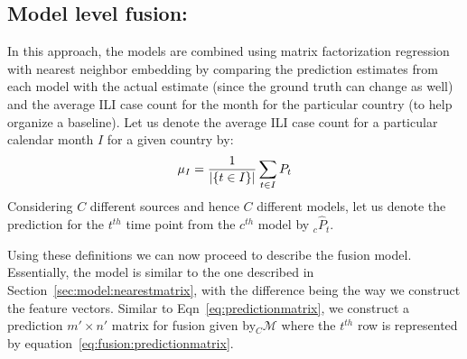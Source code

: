 \subsection{\label{sec:fusion:model} Model level fusion:}
In this approach, the models are combined using matrix factorization regression with 
nearest neighbor embedding by comparing the
prediction estimates from each model with the actual estimate (since the ground truth
can change as well) and the average
ILI case count for the month for the particular country (to help organize a baseline).
Let us denote the average ILI case count for a particular calendar 
month $I$ for a given country by:
\begin{equation*}
  \mu_I = {1 \over {|\lbrace t \in I\rbrace|}} \sum_{t \in I}P_{t}
\end{equation*}
\noindent
Considering $C$ different sources and hence $C$ different models, 
let us denote the prediction for the $t^{th}$ time point 
from the $c^{th}$ model by ${}_c\widehat{P}_t$.

Using these definitions we can now proceed to describe the fusion 
model. Essentially, the model is similar to the one described in 
Section~\ref{sec:model:nearestmatrix}, with the difference being 
the way we construct the feature vectors. Similar to Eqn~\ref{eq:predictionmatrix},
we construct a prediction  $m'\times n'$ matrix for fusion given by${}_C\mathcal{M}$ where 
the $t^{th}$ row is represented by equation~\ref{eq:fusion:predictionmatrix}.

